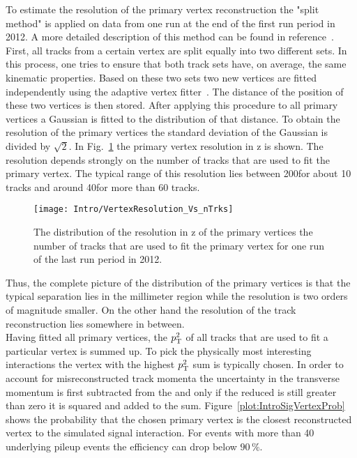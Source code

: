 To estimate the resolution of the primary vertex reconstruction the "split method" is applied on data from one run at the end of the first run period in 2012. A more detailed description of this method can be found in reference~. First, all tracks from a certain vertex are split equally into two different sets. In this process, one tries to ensure that both track sets have, on average, the same kinematic properties. Based on these two sets two new vertices are fitted independently using the adaptive vertex fitter~\cite{CMS-PAPER-TRK-11-001}. The distance of the position of these two vertices is then stored. After applying this procedure to all primary vertices a Gaussian is fitted to the distribution of that distance. To obtain the resolution of the primary vertices the standard deviation of the Gaussian is divided by $\sqrt{2}$. In Fig.~\ref{plot:IntroVertexRes} the primary vertex resolution in z is shown. The resolution depends strongly on the number of tracks that are used to fit the primary vertex. The typical range of this resolution lies between 200\mum for about 10 tracks and around 40\mum for more than 60 tracks.

\begin{figure}[Htb]
    \centering
    \texttt{[image: Intro/VertexResolution\_Vs\_nTrks]}
    \caption[Vertex resolution \vs number of used tracks]{The distribution of the resolution in z of the primary vertices \vs the number of tracks that are used to fit the primary vertex for one run of the last run period in 2012. \label{plot:IntroVertexRes}}
\end{figure}

Thus, the complete picture of the distribution of the primary vertices is that the typical separation lies in the millimeter region while the resolution is two orders of magnitude smaller. On the other hand the resolution of the track reconstruction lies somewhere in between.\\
Having fitted all primary vertices, the $p_{\mathrm{T}}^{2}$ of all tracks that are used to fit a particular vertex is summed up. To pick the physically most interesting interactions the vertex with the highest $p_{\mathrm{T}}^{2}$ sum is typically chosen. In order to account for misreconstructed track momenta the uncertainty in the transverse momentum is first subtracted from the \pt and only if the reduced \pt is still greater than zero it is squared and added to the sum. Figure~\ref{plot:IntroSigVertexProb} shows the probability that the chosen primary vertex is the closest reconstructed vertex to the simulated signal interaction. For events with more than 40 underlying pileup events the efficiency can drop below $90\,{}\%{}$.


